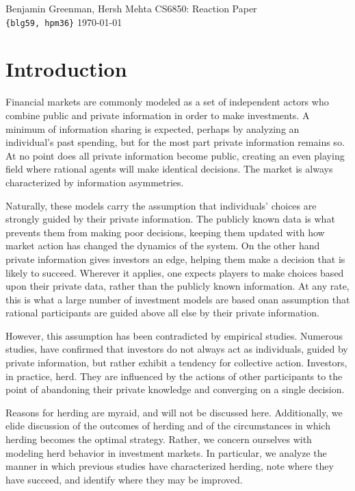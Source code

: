 \documentclass{article}
\renewcommand\maketitle{
\begin{flushleft}
{%
\large{%
Benjamin Greenman,
Hersh Mehta
\hfill
CS6850: Reaction Paper
\\\texttt{\{blg59, hpm36\}} \hfill \today
}}\\
\hrulefill
\end{flushleft}
}
\begin{document}
\maketitle

\section{Introduction}
Financial markets are commonly modeled as a set of independent actors who combine public and private information in order to make investments.
A minimum of information sharing is expected, perhaps by analyzing an individual's past spending, but for the most part private information remains so.
At no point does all private information become public, creating an even playing field where rational agents will make identical decisions.
The market is always characterized by information asymmetries.

Naturally, these models carry the assumption that individuals' choices are strongly guided by their private information.
The publicly known data is what prevents them from making poor decisions, keeping them updated with how market action has changed the dynamics of the system.
On the other hand private information gives investors an edge, helping them make a decision that is likely to succeed.
Wherever it applies, one expects players to make choices based upon their private data, rather than the publicly known information.
At any rate, this is what a large number of investment models are based on\textemdash an assumption that rational participants are guided above all else by their private information.

However, this assumption has been contradicted by empirical studies. 
Numerous studies, have confirmed that investors do not always act as individuals, guided by private information, but rather exhibit a tendency for collective action\cite[174]{cont-bouchad}.
Investors, in practice, herd.
They are influenced by the actions of other participants to the point of abandoning their private knowledge and converging on a single decision.

Reasons for herding are myraid, and will not be discussed here.
Additionally, we elide discussion of the outcomes of herding and of the circumstances in which herding becomes the optimal strategy.
Rather, we concern ourselves with modeling herd behavior in investment markets.
In particular, we analyze the manner in which previous studies have characterized herding, note where they have succeed, and identify where they may be improved.
\end{document}
